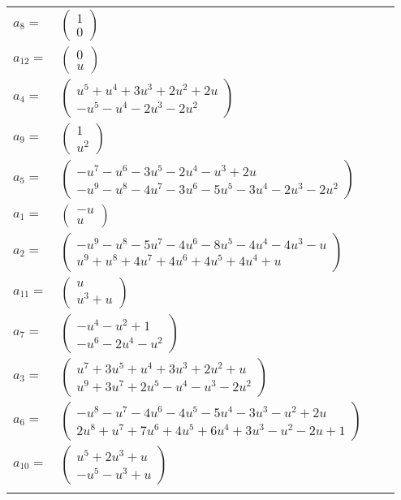 \documentclass[1p]{elsarticle_modified}
\theoremstyle{definition}
\begin{document}
\begin{tabular}{m{7pt} m{180pt} m{7pt} m{180pt} }
\flushright $a_{8}=$&$\begin{pmatrix}1\\0\end{pmatrix}$ \\
\flushright $a_{12}=$&$\begin{pmatrix}0\\u\end{pmatrix}$ \\
\flushright $a_{4}=$&$\begin{pmatrix}u^5+u^4+3 u^3+2 u^2+2 u\\- u^5- u^4-2 u^3-2 u^2\end{pmatrix}$ \\
\flushright $a_{9}=$&$\begin{pmatrix}1\\u^2\end{pmatrix}$ \\
\flushright $a_{5}=$&$\begin{pmatrix}- u^7- u^6-3 u^5-2 u^4- u^3+2 u\\- u^9- u^8-4 u^7-3 u^6-5 u^5-3 u^4-2 u^3-2 u^2\end{pmatrix}$ \\
\flushright $a_{1}=$&$\begin{pmatrix}- u\\u\end{pmatrix}$ \\
\flushright $a_{2}=$&$\begin{pmatrix}- u^9- u^8-5 u^7-4 u^6-8 u^5-4 u^4-4 u^3- u\\u^9+u^8+4 u^7+4 u^6+4 u^5+4 u^4+u\end{pmatrix}$ \\
\flushright $a_{11}=$&$\begin{pmatrix}u\\u^3+u\end{pmatrix}$ \\
\flushright $a_{7}=$&$\begin{pmatrix}- u^4- u^2+1\\- u^6-2 u^4- u^2\end{pmatrix}$ \\
\flushright $a_{3}=$&$\begin{pmatrix}u^7+3 u^5+u^4+3 u^3+2 u^2+u\\u^9+3 u^7+2 u^5- u^4- u^3-2 u^2\end{pmatrix}$ \\
\flushright $a_{6}=$&$\begin{pmatrix}- u^8- u^7-4 u^6-4 u^5-5 u^4-3 u^3- u^2+2 u\\2 u^8+u^7+7 u^6+4 u^5+6 u^4+3 u^3- u^2-2 u+1\end{pmatrix}$ \\
\flushright $a_{10}=$&$\begin{pmatrix}u^5+2 u^3+u\\- u^5- u^3+u\end{pmatrix}$\\&\end{tabular}
\end{document}

